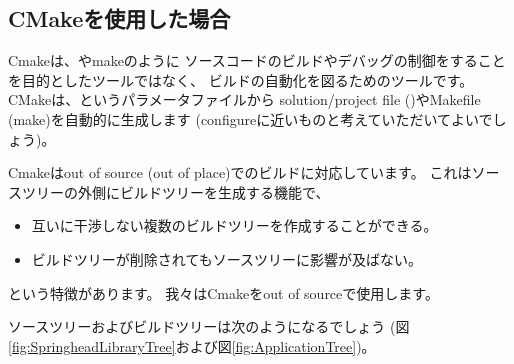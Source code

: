 \subsection{CMakeを使用した場合}
\label{subsec:WhenUsedCMake}

\noindent
Cmakeは、\VS やmakeのように
ソースコードのビルドやデバッグの制御をすることを目的としたツールではなく、
ビルドの自動化を図るためのツールです。
CMakeは、\CMakeLists{}というパラメータファイルから
solution/project file (\VS)やMakefile (make)を自動的に生成します
(configureに近いものと考えていただいてよいでしょう)。

\medskip
\noindent
Cmakeはout of source (out of place)でのビルドに対応しています。
これはソースツリーの外側にビルドツリーを生成する機能で、
\begin{itemize}
  \item	互いに干渉しない複数のビルドツリーを作成することができる。
  \item	ビルドツリーが削除されてもソースツリーに影響が及ばない。
\end{itemize}
という特徴があります。
我々はCmakeをout of sourceで使用します。

\medskip
\noindent
ソースツリーおよびビルドツリーは次のようになるでしょう
(図\ref{fig:SpringheadLibraryTree}および図\ref{fig:ApplicationTree})。


